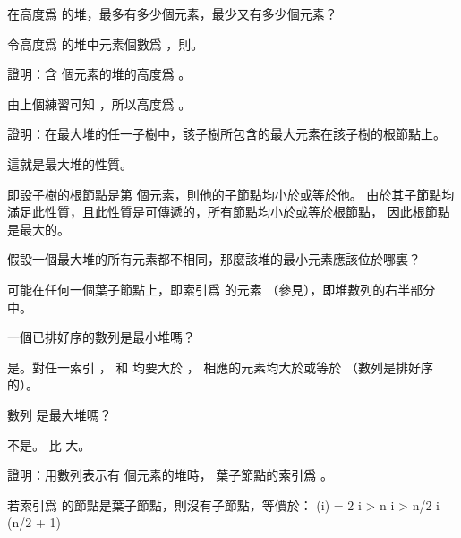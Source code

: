 \startsection[
  reference=section:heaps,
  title={Heaps},
]

\startEXERCISE
在高度爲  的堆，最多有多少個元素，最少又有多少個元素？
\stopEXERCISE

\startANSWER
令高度爲  的堆中元素個數爲 ，則。
\stopANSWER

證明：含  個元素的堆的高度爲 。
\stopEXERCISE

\startANSWER
由上個練習可知 ，所以高度爲 。
\stopANSWER

\startEXERCISE
證明：在最大堆的任一子樹中，該子樹所包含的最大元素在該子樹的根節點上。
\stopEXERCISE

\startANSWER
這就是最大堆的性質。

即設子樹的根節點是第  個元素，則他的子節點均小於或等於他。
由於其子節點均滿足此性質，且此性質是可傳遞的，所有節點均小於或等於根節點，
因此根節點是最大的。
\stopANSWER

\startEXERCISE
假設一個最大堆的所有元素都不相同，那麼該堆的最小元素應該位於哪裏？
\stopEXERCISE

\startANSWER
可能在任何一個葉子節點上，即索引爲  的元素
（參見），即堆數列的右半部分中。
\stopANSWER

\startEXERCISE
一個已排好序的數列是最小堆嗎？
\stopEXERCISE

\startANSWER
是。對任一索引 ，  和  均要大於 ，
相應的元素均大於或等於 （數列是排好序的）。
\stopANSWER

\startEXERCISE
數列  是最大堆嗎？
\stopEXERCISE

\startANSWER
不是。  比  大。

\externalfigure[output/e6_1_6-1]

\stopANSWER

證明：用數列表示有  個元素的堆時，
葉子節點的索引爲 。
\stopEXERCISE

\startANSWER
若索引爲  的節點是葉子節點，則沒有子節點，等價於：
\startformula\startmathalignment[n=1]
\NC {}(i) = 2 i > n \NR
\NC i > n/2 \NR
\NC i \ge (\lfloor n/2 \rfloor + 1) \NR
\stopmathalignment\stopformula
\stopANSWER

\stopsection%
